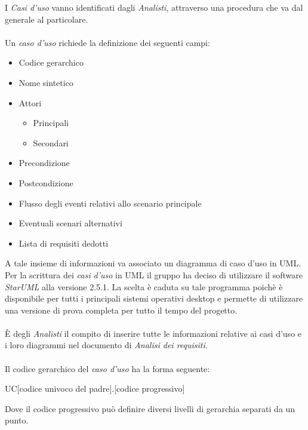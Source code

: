 \documentclass[a4paper]{report}
\begin{document}
		 I \emph{Casi d'uso} vanno identificati dagli \emph{Analisti}, attraverso una procedura che va dal 
		 generale al particolare. 
		  \\ \\
		 Un \emph{caso d'uso} richiede la definizione dei seguenti campi:
		 \begin{itemize}
		 	\item Codice gerarchico 
		 	\item Nome sintetico
		 	\item Attori
		 	\begin{itemize}
		 		\item Principali
		 		\item Secondari
		 	\end{itemize}
		 	\item Precondizione
		 	\item Postcondizione
		 	\item Flusso degli eventi relativi allo scenario principale
		 	\item Eventuali scenari alternativi
		 	\item Lista di requisiti dedotti 
		 \end{itemize}
		 A tale insieme di informazioni va associato un diagramma di caso d'uso in UML. Per la 
		 scrittura dei \emph{casi d'uso} in UML il gruppo ha deciso di utilizzare il software
		  \emph{StarUML} alla versione 2.5.1. La scelta è  caduta su tale programma poichè 
		  è disponibile per tutti i principali sistemi operativi desktop e permette di
		   utilizzare una versione di prova completa per tutto il tempo del progetto.
		  \\ \\
		  È degli \emph{Analisti} il compito di inserire tutte le informazioni relative ai casi 
		  d'uso e i loro diagrammi nel documento di \emph{Analisi dei requisiti}.
		  \\ \\
		 Il codice gerarchico del \emph{caso d'uso} ha la forma seguente:
		 \begin{center}
		 	UC[codice univoco del padre].[codice progressivo]
		 \end{center}
		 Dove il codice progressivo può definire diversi livelli di gerarchia separati da un punto.
		 
\end{document}
